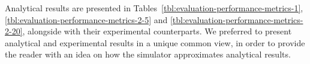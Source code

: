 Analytical results are presented in Tables~\ref{tbl:evaluation-performance-metrics-1}, \ref{tbl:evaluation-performance-metrics-2-5} and \ref{tbl:evaluation-performance-metrics-2-20}, alongside with their experimental counterparts.
%
We preferred to present analytical and experimental results in a unique common view, in order to provide the reader with an idea on how the simulator approximates analytical results.